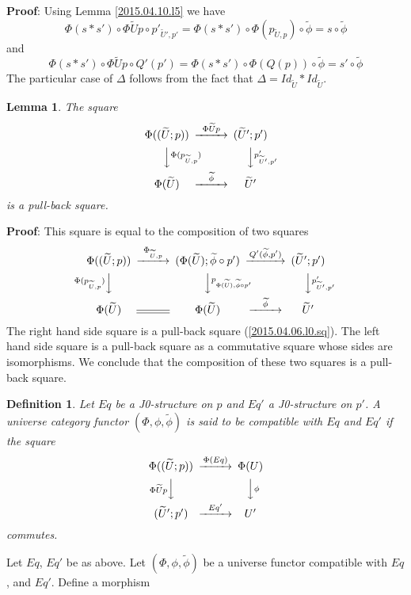 \documentclass[12pt]{article}
\newenvironment{eq}{\begin{equation}}{\end{equation}}
\newenvironment{myproof}{{\bf Proof}:}{\vskip 5mm }
\newtheorem{lemma}[proposition]{Lemma}
\newtheorem{definition}[proposition]{Definition}
\newcommand{\llabel}[1]{\label{#1}}
\newcommand{\wt}{\widetilde}
\begin{document}
%
\begin{myproof}
Using Lemma \ref{2015.04.10.l5} we have
%
$$\Phi(s*s')\circ \Phi\wt{U}p\circ p'_{\wt{U}',p'}=\Phi(s*s')\circ\Phi(p_{\wt{U},p})\circ\wt{\phi}=s\circ \wt{\phi}$$
%
and
%
$$\Phi(s*s')\circ \Phi\wt{U}p\circ Q'(p')=\Phi(s*s')\circ \Phi(Q(p))\circ \wt{\phi}=s'\circ\wt{\phi}$$
%
The particular case of $\Delta$ follows from the fact that $\Delta=Id_{\wt{U}}*Id_{\wt{U}}$. 
\end{myproof}
%
\begin{lemma}
\llabel{2015.04.06.l5}
The square
%
$$
\begin{CD}
\Phi((\wt{U};p)) @>\Phi\wt{U}p>> (\wt{U}';p')\\
@VV \Phi(p_{\wt{U},p}) V @VV p'_{\wt{U}',p'}V\\
\Phi(\wt{U}) @>\wt{\phi}>> \wt{U}'
\end{CD}
$$
%
is a pull-back square.
\end{lemma}
%
\begin{myproof}
This square is equal to the composition of two squares
%
$$
\begin{CD}
\Phi((\wt{U};p)) @>\Phi_{\wt{U},p}>> (\Phi(\wt{U});\wt{\phi}\circ p') @>Q'(\wt{\phi},p')>> (\wt{U}';p')\\
@V\Phi(p_{\wt{U},p}) VV @VV p_{\Phi(\wt{U}),\wt{\phi}\circ p'}V @VVp'_{\wt{U}',p'}V\\
\Phi(\wt{U}) @= \Phi(\wt{U}) @>\wt{\phi}>> \wt{U}'
\end{CD}
$$
%
The right hand side square is a pull-back square (\ref{2015.04.06.l0.sq}). The left hand side square is a pull-back square as a commutative square whose sides are isomorphisms. We conclude that the composition of these two squares is a pull-back square.
\end{myproof}
%
\begin{definition}
\llabel{2015.04.06.def4}
Let $Eq$ be a J0-structure on $p$ and $Eq'$ a J0-structure on $p'$. A universe category functor $(\Phi,\phi,\wt{\phi})$ is said to be compatible with $Eq$ and $Eq'$ if the square
%
\begin{eq}\llabel{2015.04.06.eq6}
\begin{CD}
\Phi((\wt{U};p)) @>\Phi(Eq)>> \Phi(U)\\
@V\Phi\wt{U}p VV @VV\phi V\\
(\wt{U}';p') @>Eq'>> U'
\end{CD}
\end{eq}
%
commutes.
\end{definition}
%
Let $Eq$, $Eq'$ be as above. Let $(\Phi,\phi,\wt{\phi})$ be a universe functor compatible with $Eq$, and $Eq'$. Define a morphism
\end{document}
